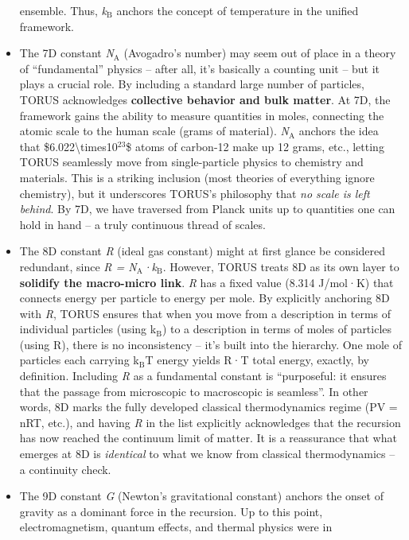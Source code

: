\documentclass[]{article}
\newcommand{\subscript}[1]{\ensuremath{_{\mathrm{#1}}}}
\newcommand{\superscript}[1]{\ensuremath{^{\mathrm{#1}}}}
\begin{document}
\begin{itemize}
  ensemble. Thus,
  \emph{k\subscript{B}}
  anchors the concept of temperature in the unified framework.
\item
  The 7D constant
  \emph{N\subscript{A}}
  (Avogadro's number) may seem out of place in a theory of
  ``fundamental'' physics -- after all, it's basically a counting unit
  -- but it plays a crucial role. By including a standard large number
  of particles, TORUS acknowledges \textbf{collective behavior and bulk
  matter}. At 7D, the framework gains the ability to measure quantities
  in moles, connecting the atomic scale to the human scale (grams of
  material).
  \emph{N\subscript{A}}
  anchors the idea that \$6.022\textbackslash{}times10\superscript{23}\$ atoms
  of carbon-12 make up 12 grams, etc., letting TORUS seamlessly move
  from single-particle physics to chemistry and materials. This is a
  striking inclusion (most theories of everything ignore chemistry), but
  it underscores TORUS's philosophy that \emph{no scale is left behind}.
  By 7D, we have traversed from Planck units up to quantities one can
  hold in hand -- a truly continuous thread of scales​.
\item
  The 8D constant \emph{R} (ideal gas constant) might at first glance be
  considered redundant, since \emph{R =
  N\subscript{A}·k\subscript{B}}.
  However, TORUS treats 8D as its own layer to \textbf{solidify the
  macro-micro link}. \emph{R} has a fixed value (8.314 J/mol·K) that
  connects energy per particle to energy per mole. By explicitly
  anchoring 8D with \emph{R}, TORUS ensures that when you move from a
  description in terms of individual particles (using
  k\subscript{B}) to a
  description in terms of moles of particles (using R), there is no
  inconsistency -- it's built into the hierarchy. One mole of particles
  each carrying
  k\subscript{B}T energy
  yields R·T total energy, exactly, by definition. Including \emph{R} as
  a fundamental constant is ``purposeful: it ensures that the passage
  from microscopic to macroscopic is seamless''​. In other words, 8D
  marks the fully developed classical thermodynamics regime (PV = nRT,
  etc.), and having \emph{R} in the list explicitly acknowledges that
  the recursion has now reached the continuum limit of matter. It is a
  reassurance that what emerges at 8D is \emph{identical} to what we
  know from classical thermodynamics -- a continuity check.
\item
  The 9D constant \emph{G} (Newton's gravitational constant) anchors the
  onset of gravity as a dominant force in the recursion. Up to this
  point, electromagnetism, quantum effects, and thermal physics were in

\end{itemize}
\end{document}
